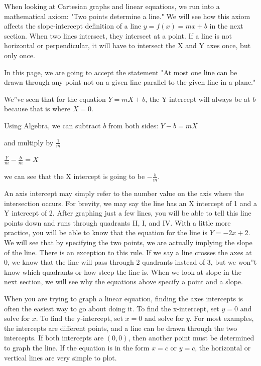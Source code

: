 When looking at Cartesian graphs and linear equations, we run into a mathematical axiom: "Two points determine a line." We will see how this axiom affects the slope-intercept definition of a line $y = f(x) = mx + b$ in the next section. When two lines intersect, they intersect at a point. If a line is not horizontal or perpendicular, it will have to intersect the X and Y axes once, but only once.



In this page, we are going to accept the statement "At most one line can be drawn through any point not on a given line parallel to the given line in a plane."



We''ve seen that for the equation $Y = mX + b$, the Y intercept will always be at $b$ because that is where $X = 0$.



Using Algebra, we can subtract $b$ from both sides: $Y - b = mX$



and multiply by $\frac{1}{m}$



$\frac{Y}{m} - \frac{b}{m} = X$



we can see that the X intercept is going to be $-\frac{b}{m}$.



An axis intercept may simply refer to the number value on the axis where the intersection occurs. For brevity, we may say the line has an X intercept of 1 and a Y intercept of 2. After graphing just a few lines, you will be able to tell this line points down and runs through quadrants II, I, and IV. With a little more practice, you will be able to know that the equation for the line is $Y = -2x + 2$. We will see that by specifying the two points, we are actually implying the slope of the line. There is an exception to this rule. If we say a line crosses the axes at 0, we know that the line will pass through 2 quadrants instead of 3, but we won''t know which quadrants or how steep the line is. When we look at slope in the next section, we will see why the equations above specify a point and a slope.



When you are trying to graph a linear equation, finding the axes intercepts is often the easiest way to go about doing it. To find the x-intercept, set $y = 0$ and solve for $x$. To find the y-intercept, set $x = 0$ and solve for $y$. For most examples, the intercepts are different points, and a line can be drawn through the two intercepts. If both intercepts are $(0, 0)$, then another point must be determined to graph the line. If the equation is in the form $x = c$ or $y = c$, the horizontal or vertical lines are very simple to plot.



